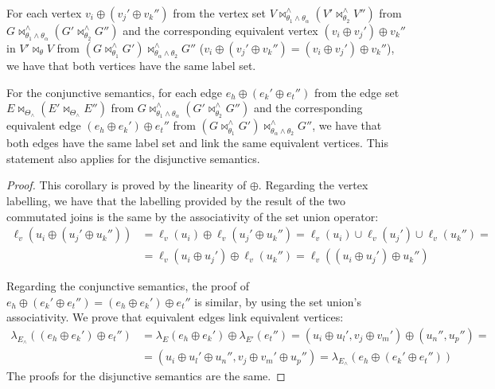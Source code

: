 \begin{corollary}\label{coroll:Comm}
	For each vertex $v_i\oplus (v_j' \oplus v_k'')$ from the vertex set $V\bowtie_{\theta_1\wedge\theta_\alpha}^\wedge (V'\bowtie_{\theta_2}^\wedge V'')$ from
	$G\bowtie_{\theta_1\wedge\theta_\alpha}^\wedge (G'\bowtie_{\theta_2}^\wedge G'')$ and the corresponding equivalent vertex $(v_i\oplus v_j')\oplus v_k''$ in $V'\bowtie_\theta V$ from
	$(G\bowtie_{\theta_1}^\wedge G')\bowtie_{\theta_\alpha\wedge \theta_2}^\wedge G''$ ($v_i\oplus (v_j'\oplus v_k'')=(v_i\oplus v_j')\oplus v_k''$), we have that both vertices have the same label set.

	For the conjunctive semantics, for each edge $e_h\oplus (e_k'\oplus e_t'')$ from the edge set $E\bowtie_{\Theta_\wedge} (E'\bowtie_{\Theta_\wedge}E'')$ from
	$G\bowtie_{\theta_1\wedge\theta_\alpha}^\wedge (G'\bowtie_{\theta_2}^\wedge G'')$ and the corresponding equivalent edge $(e_h\oplus e_k')\oplus e_t''$  from
	$ (G\bowtie_{\theta_1}^\wedge G')\bowtie_{\theta_\alpha\wedge \theta_2}^\wedge G''$, we have that both edges have the same label set and link
	the same equivalent vertices. This statement also applies for the disjunctive semantics.
\end{corollary}
\begin{proof}
	This corollary is proved by the linearity of $\oplus$. Regarding the vertex labelling, we have that the labelling provided by the result of the two commutated joins is the same by the associativity of the set union operator:
	\[\begin{split}
	\ell_v(u_i\oplus (u_j'\oplus u_k''))&=\ell_v(u_i)\oplus \ell_v(u_j'\oplus u_k'')=\ell_v(u_i)\cup\ell_v(u_j')\cup\ell_v(u_k'')=\\
	&=\ell_v(u_i\oplus u_j')\oplus\ell_v(u_k'')=\ell_v((u_i\oplus u_j')\oplus u_k'')
	\end{split}
	\]

	Regarding the conjunctive semantics, the proof of $e_h\oplus (e_k'\oplus e_t'')=(e_h\oplus e_k')\oplus e_t''$ is similar, by using the set union's associativity. We  prove that equivalent edges link equivalent vertices:
	\[\begin{split}
	\lambda_{E_\wedge}((e_h\oplus e_k')\oplus e_t'')&=\lambda_E(e_h\oplus e_k')\oplus\lambda_{E'}(e_t'')=(u_i\oplus u_l',v_j\oplus v_m')\oplus(u_n'',u_p'')=\\
	&=(u_i\oplus u_l'\oplus u_n'',v_j\oplus v_m'\oplus u_p'') = \lambda_{E_\wedge}(e_h\oplus (e_k'\oplus e_t''))
	\end{split}  \]
	The proofs for the disjunctive semantics are the same.
\end{proof}

